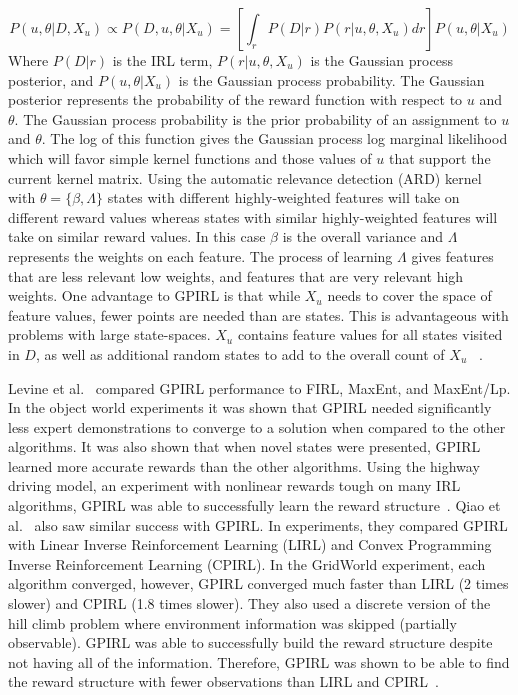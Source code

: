 \documentclass[12pt,american]{report}
\begin{document}
\begin{equation}
            \label{eq:GP_full}
           P(u,\theta|D,X_u)\propto P(D,u,\theta|X_u) = [\int_{r}P(D|r)P(r|u,\theta,X_u)dr]P(u,\theta|X_u)%
        \end{equation}
Where $P(D|r)$ is the IRL term, $P(r|u,\theta,X_u)$ is the Gaussian process posterior, and $P(u,\theta|X_u)$ is the Gaussian process probability.  The Gaussian posterior represents the probability of the reward function with respect to $u$ and $\theta$. The Gaussian process probability is the prior probability of an assignment to $u$ and $\theta$. The log of this function gives the Gaussian process log marginal likelihood which will favor simple kernel functions and those values of $u$ that support the current kernel matrix.  Using the automatic relevance detection (ARD) kernel with $\theta = \{ \beta,\Lambda \}$ states with different highly-weighted features will take on different reward values whereas states with similar highly-weighted features will take on similar reward values. In this case $\beta$ is the overall variance and $\Lambda$ represents the weights on each feature. The process of learning $\Lambda$ gives features that are less relevant low weights, and features that are very relevant high weights. One advantage to GPIRL is that while $X_u$ needs to cover the space of feature values, fewer points are needed than are states.  This is advantageous with problems with large state-spaces. $X_u$ contains feature values for all states visited in $D$, as well as additional random states to add to the overall count of $X_u$~\cite{levine2011nonlinear} . 

Levine et al.~\cite{levine2011nonlinear} compared GPIRL performance to FIRL, MaxEnt, and MaxEnt/Lp. In the object world experiments it was shown that GPIRL needed significantly less expert demonstrations to converge to a solution when compared to the other algorithms. It was also shown that when novel states were presented, GPIRL learned more accurate rewards than the other algorithms.  Using the highway driving model, an experiment with nonlinear rewards tough on many IRL algorithms, GPIRL was able to successfully learn the reward structure~\cite{levine2011nonlinear}. Qiao et al.~\cite{qiao2011inverse} also saw similar success with GPIRL.  In experiments, they compared GPIRL with Linear Inverse Reinforcement Learning (LIRL) and Convex Programming Inverse Reinforcement Learning (CPIRL). In the GridWorld experiment, each algorithm converged, however, GPIRL converged much faster than LIRL (2 times slower) and CPIRL (1.8 times slower).  They also used a discrete version of the hill climb problem where  environment information was skipped (partially observable).  GPIRL was able to successfully build the reward structure despite not having all of the information. Therefore, GPIRL was shown to be able to find the reward structure with fewer observations than LIRL and CPIRL~\cite{qiao2011inverse}.
\end{document}
